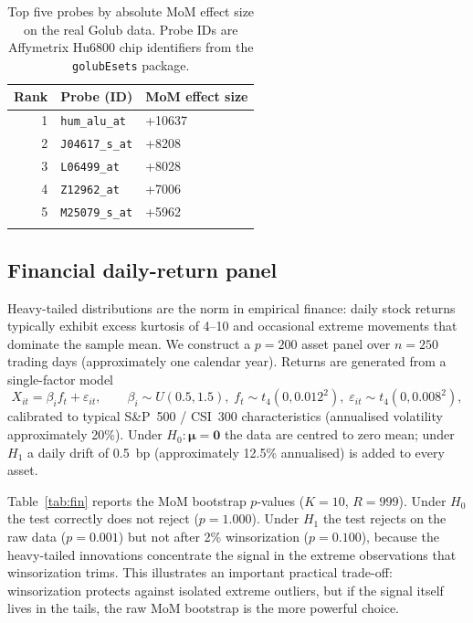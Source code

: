 \documentclass[pdflatex,sn-mathphys-num]{sn-jnl}
\newcommand{\bmu}{\boldsymbol{\mu}}
\newcommand{\bzero}{\mathbf{0}}
\theoremstyle{thmstyleone}%
\theoremstyle{thmstyletwo}%
\theoremstyle{thmstylethree}%
\begin{document}
\begin{table}[t]
\centering\small
\caption{Top five probes by absolute MoM effect size on the real Golub data.
Probe IDs are Affymetrix Hu6800 chip identifiers from the
\texttt{golubEsets} package.}
\label{tab:realgenes}
\begin{tabular}{rll}
\toprule
Rank & Probe (ID) & MoM effect size \\
\midrule
1 & \texttt{hum\_alu\_at} & +10637 \\
2 & \texttt{J04617\_s\_at} & +8208 \\
3 & \texttt{L06499\_at} & +8028 \\
4 & \texttt{Z12962\_at} & +7006 \\
5 & \texttt{M25079\_s\_at} & +5962 \\
\botrule
\end{tabular}
\end{table}

\subsection{Financial daily-return panel}

Heavy-tailed distributions are the norm in empirical finance: daily stock
returns typically exhibit excess kurtosis of 4--10 and occasional extreme
movements that dominate the sample mean.  We construct a $p=200$ asset panel
over $n=250$ trading days (approximately one calendar year).  Returns are
generated from a single-factor model
\begin{equation}
\label{eq:finmodel}
X_{it} = \beta_i f_t + \varepsilon_{it},
\qquad \beta_i\sim U(0.5,1.5),\;
f_t\sim t_4(0,0.012^2),\;
\varepsilon_{it}\sim t_4(0,0.008^2),
\end{equation}
calibrated to typical S\&P~500 / CSI~300 characteristics (annualised
volatility approximately 20\%).  Under $H_0:\bmu=\bzero$ the data are centred
to zero mean; under $H_1$ a daily drift of 0.5~bp (approximately 12.5\%
annualised) is added to every asset.

Table~\ref{tab:fin} reports the MoM bootstrap $p$-values ($K=10$, $R=999$).
Under $H_0$ the test correctly does not reject ($p=1.000$).  Under $H_1$ the
test rejects on the raw data ($p=0.001$) but not after 2\% winsorization
($p=0.100$), because the heavy-tailed innovations concentrate the signal in
the extreme observations that winsorization trims.  This illustrates an
important practical trade-off: winsorization protects against isolated extreme
outliers, but if the signal itself lives in the tails, the raw MoM bootstrap
is the more powerful choice.
\end{document}
